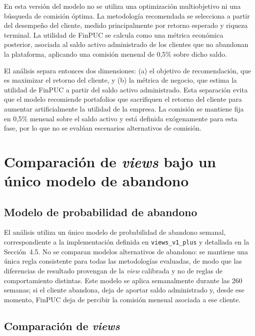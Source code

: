 En esta versi\'on del modelo no se utiliza una optimizaci\'on multiobjetivo ni
una b\'usqueda de comisi\'on \'optima. La metodolog\'ia recomendada se
selecciona a partir del desempe\~no del cliente, medido principalmente por
retorno esperado y riqueza terminal. La utilidad de FinPUC se calcula como una
m\'etrica econ\'omica posterior, asociada al saldo activo administrado de los
clientes que no abandonan la plataforma, aplicando una comisi\'on mensual de
0,5\% sobre dicho saldo.

El an\'alisis separa entonces dos dimensiones: (a) el objetivo de
recomendaci\'on, que es maximizar el retorno del cliente, y (b) la m\'etrica de
negocio, que estima la utilidad de FinPUC a partir del saldo activo
administrado. Esta separaci\'on evita que el modelo recomiende portafolios que
sacrifiquen el retorno del cliente para aumentar artificialmente la utilidad de
la empresa. La comisi\'on se mantiene fija en 0,5\% mensual sobre el saldo
activo y est\'a definida ex\'ogenamente para esta fase, por lo que no se
eval\'uan escenarios alternativos de comisi\'on.

\section{Comparaci\'on de \textit{views} bajo un \'unico modelo de abandono}

\subsection{Modelo de probabilidad de abandono}

El an\'alisis utiliza un \'unico modelo de probabilidad de abandono semanal,
correspondiente a la implementaci\'on definida en \texttt{views\_v1\_plus} y
detallada en la Secci\'on~4.5. No se comparan modelos alternativos de abandono:
se mantiene una \'unica regla consistente para todas las metodolog\'ias
evaluadas, de modo que las diferencias de resultado provengan de la
\textit{view} calibrada y no de reglas de comportamiento distintas. Este modelo
se aplica semanalmente durante las 260 semanas; si el cliente abandona, deja de
aportar saldo administrado y, desde ese momento, FinPUC deja de percibir la
comisi\'on mensual asociada a ese cliente.

\subsection{Comparaci\'on de \textit{views}}

